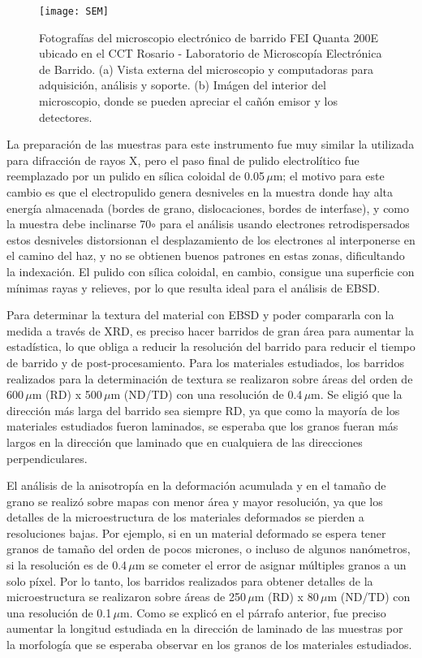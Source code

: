 \begin{figure}[!htb]
  \centering
  \texttt{[image: SEM]}
  \caption{Fotografías del microscopio electrónico de barrido FEI Quanta 200E ubicado en el CCT Rosario - Laboratorio de Microscopía Electrónica de Barrido. (a) Vista externa del microscopio y computadoras para adquisición, análisis y soporte. (b) Imágen del interior del microscopio, donde se pueden apreciar el cañón emisor y los detectores.}
  \label{fig:SEM}
\end{figure}

La preparación de las muestras para este instrumento fue muy similar la utilizada para difracción de rayos X, pero el paso final de pulido electrolítico fue reemplazado por un pulido en sílica coloidal de 0.05\,$\mu$m; el motivo para este cambio es que el electropulido genera desniveles en la muestra donde hay alta energía almacenada (bordes de grano, dislocaciones, bordes de interfase), y como la muestra debe inclinarse 70$\circ$ para el análisis usando electrones retrodispersados estos desniveles distorsionan el desplazamiento de los electrones al interponerse en el camino del haz, y no se obtienen buenos patrones en estas zonas, dificultando la indexación.
El pulido con sílica coloidal, en cambio, consigue una superficie con mínimas rayas y relieves, por lo que resulta ideal para el análisis de EBSD.

Para determinar la textura del material con EBSD y poder compararla con la medida a través de XRD, es preciso hacer barridos de gran área para aumentar la estadística, lo que obliga a reducir la resolución del barrido para reducir el tiempo de barrido y de post-procesamiento.
Para los materiales estudiados, los barridos realizados para la determinación de textura se realizaron sobre áreas del orden de 600\,$\mu$m (RD) x 500\,$\mu$m (ND/TD) con una resolución de 0.4\,$\mu$m.
Se eligió que la dirección más larga del barrido sea siempre RD, ya que como la mayoría de los materiales estudiados fueron laminados, se esperaba que los granos fueran más largos en la dirección que laminado que en cualquiera de las direcciones perpendiculares.

El análisis de la anisotropía en la deformación acumulada y en el tamaño de grano se realizó sobre mapas con menor área y mayor resolución, ya que los detalles de la microestructura de los materiales deformados se pierden a resoluciones bajas.
Por ejemplo, si en un material deformado se espera tener granos de tamaño del orden de pocos micrones, o incluso de algunos nanómetros, si la resolución es de 0.4\,$\mu$m se cometer el error de asignar múltiples granos a un solo píxel.
Por lo tanto, los barridos realizados para obtener detalles de la microestructura se realizaron sobre áreas de 250\,$\mu$m (RD) x 80\,$\mu$m (ND/TD) con una resolución de 0.1\,$\mu$m.
Como se explicó en el párrafo anterior, fue preciso aumentar la longitud estudiada en la dirección de laminado de las muestras por la morfología que se esperaba observar en los granos de los materiales estudiados.

